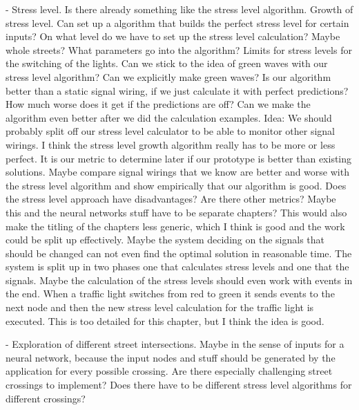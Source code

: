 - Stress level. Is there already something like the stress level algorithm. Growth of stress level. Can set up a algorithm that builds the perfect stress level for certain inputs? On what level do we have to set up the stress level calculation? Maybe whole streets? What parameters go into the algorithm? Limits for stress levels for the switching of the lights. Can we stick to the idea of green waves with our stress level algorithm? Can we explicitly make green waves? Is our algorithm better than a static signal wiring, if we just calculate it with perfect predictions? How much worse does it get if the predictions are off? Can we make the algorithm even better after we did the calculation examples. Idea: We should probably split off our stress level calculator to be able to monitor other signal wirings. I think the stress level growth algorithm really has to be more or less perfect. It is our metric to determine later if our prototype is better than existing solutions. Maybe compare signal wirings that we know are better and worse with the stress level algorithm and show empirically that our algorithm is good. Does the stress level approach have disadvantages? Are there other metrics? Maybe this and the neural networks stuff have to be separate chapters? This would also make the titling of the chapters less generic, which I think is good and the work could be split up effectively. Maybe the system deciding on the signals that should be changed can not even find the optimal solution in reasonable time. The system is split up in two phases one that calculates stress levels and one that the signals. Maybe the calculation of the stress levels should even work with events in the end. When a traffic light switches from red to green it sends events to the next node and then the new stress level calculation for the traffic light is executed. This is too detailed for this chapter, but I think the idea is good.

- Exploration of different street intersections. Maybe in the sense of inputs for a neural network, because the input nodes and stuff should be generated by the application for every possible crossing. Are there especially challenging street crossings to implement? Does there have to be different stress level algorithms for different crossings?

